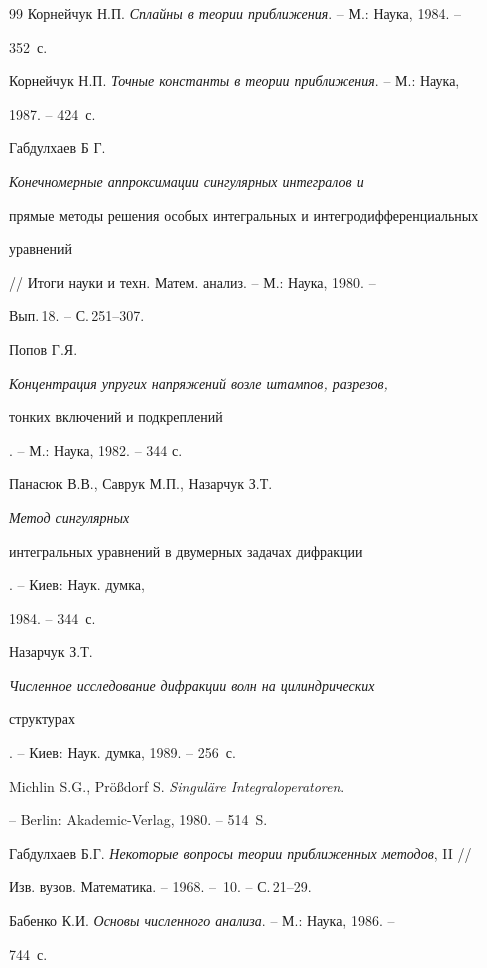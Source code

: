 \begin{thebibliography}{99}
Корнейчук Н.П. {\em Сплайны в теории приближения}. -- М.: Наука, 1984. --


352~с.




Корнейчук Н.П. {\em Точные константы в теории приближения}. -- М.: Наука,


1987. -- 424~с.




Габдулхаев Б Г. {\em Конечномерные аппроксимации сингулярных интегралов и


прямые методы решения особых интегральных и интегродифференциальных


уравнений} // Итоги науки и техн. Матем. анализ. -- М.: Наука, 1980. --


Вып.\,18. -- С.\,251--307.




Попов Г.Я. {\em Концентрация упругих напряжений возле штампов, разрезов,


тонких включений и подкреплений}. -- М.: Наука, 1982. -- 344 с.




Панасюк В.В., Саврук М.П., Назарчук З.Т. {\em Метод сингулярных


интегральных уравнений в двумерных задачах дифракции}. -- Киев: Наук. думка,


1984. -- 344~с.




Назарчук З.Т. {\em Численное исследование дифракции волн на цилиндрических


структурах}. -- Киев: Наук. думка, 1989. -- 256~с.




Michlin S.G., Pr\"o\ss{}dorf S. {\em Singul\"are Integraloperatoren}.


-- Berlin: Akademic-Verlag, 1980. -- 514~S.




Габдулхаев Б.Г. {\em Некоторые вопросы теории приближенных методов}, II //


Изв. вузов. Математика. -- 1968. -- \No\,10. -- С.\,21--29.




Бабенко К.И. {\em Основы численного анализа}. -- М.: Наука, 1986. --


744~с.





\end{thebibliography}





\vskip 2cm














\label{end}








